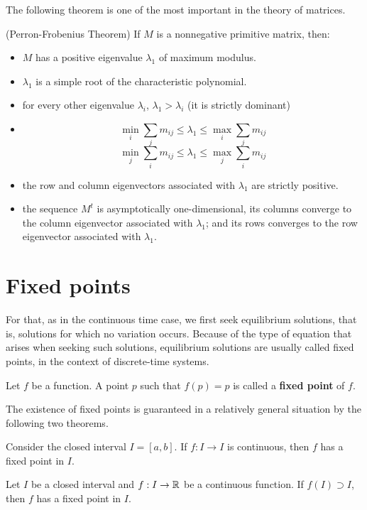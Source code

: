 The following theorem is one of the most important in the theory of matrices.
\begin{theorem}(Perron-Frobenius Theorem)
If $M$ is a nonnegative primitive matrix, then:
\begin{itemize}
\item $M$ has a positive eigenvalue $\lambda_1$ of maximum modulus.
\item $\lambda_1$ is a simple root of the characteristic polynomial.
\item for every other eigenvalue $\lambda _i$, $\lambda_1>\lambda_i$ (it is strictly dominant)
\item $$\min_{i}\sum_j m_{ij}\leq \lambda _1 \leq \max_{i}\sum_j m_{ij} $$
$$\min_{j}\sum_i m_{ij}\leq \lambda _1 \leq \max_{j}\sum_i m_{ij} $$
\item the row and column eigenvectors associated with $\lambda_1$ are strictly positive.
\item the sequence $M^t$ is asymptotically one-dimensional, its columns converge to the column eigenvector associated with $\lambda_1$; and its rows converges to the row eigenvector associated with $\lambda_1$.
\end{itemize}
\end{theorem}



\section{Fixed points}
For that, as in the continuous time case, we first seek equilibrium solutions, that is, solutions for which no variation occurs. Because of the type of equation that arises when seeking such solutions, equilibrium solutions are usually called fixed points, in the context of discrete-time systems.

\begin{definition}
Let $f$ be a function. A point $p$ such that $f(p)=p$ is called a \textbf{fixed point} of $f$.
\end{definition}
The existence of fixed points is guaranteed in a relatively general situation by the following two theorems.
\begin{theorem}
Consider the closed interval $I=[a,b]$. If $f:I\to I$ is continuous, then $f$ has a fixed point in $I$.
\end{theorem}
\begin{theorem}
Let $I$ be a closed interval and $f:I\to\mathbb{R}$ be a continuous function. If $f(I)\supset I$, then $f$ has a fixed point in $I$.
\end{theorem}

